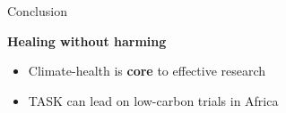 \documentclass{beamer}
\newcommand{\highlight}[1]{\textcolor{taskred}{\textbf{#1}}}
\begin{document}
\begin{frame}{Conclusion}
    \begin{center}
    \Large\textbf{\textcolor{taskblue}{Healing without harming}}
    \end{center}
    
    
    \begin{itemize}[itemsep=0.7em]
        \item Climate-health is \highlight{core} to effective research
        \item TASK can lead on low-carbon trials in Africa
    \end{itemize}
\end{frame}
\end{document}
